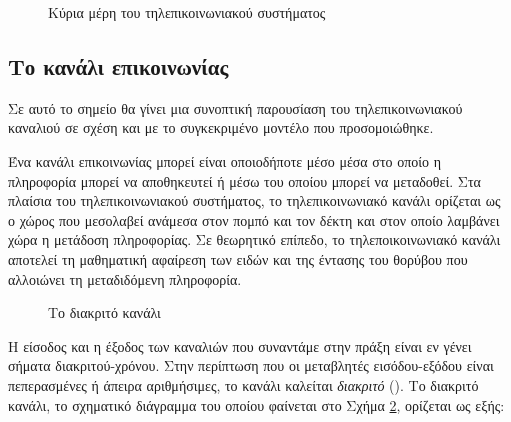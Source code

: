 \begin{figure}[h]
\caption{Κύρια μέρη του τηλεπικοινωνιακού συστήματος}
\label{fig:telecom system 2}
\end{figure}

\subsection*{Το κανάλι επικοινωνίας}
Σε αυτό το σημείο θα γίνει μια συνοπτική παρουσίαση του τηλεπικοινωνιακού καναλιού σε σχέση και με το συγκεκριμένο μοντέλο που προσομοιώθηκε.

Ένα κανάλι επικοινωνίας μπορεί είναι οποιοδήποτε μέσο μέσα στο οποίο η πληροφορία μπορεί να αποθηκευτεί ή μέσω του οποίου μπορεί να μεταδοθεί. Στα πλαίσια του τηλεπικοινωνιακού συστήματος, το τηλεπικοινωνιακό κανάλι ορίζεται ως ο χώρος που μεσολαβεί ανάμεσα στον πομπό και τον δέκτη και στον οποίο λαμβάνει χώρα η μετάδοση πληροφορίας. Σε θεωρητικό επίπεδο, το τηλεποικοινωνιακό κανάλι αποτελεί τη μαθηματική αφαίρεση των ειδών και της έντασης του θορύβου που αλλοιώνει τη μεταδιδόμενη πληροφορία.

\begin{figure}[h]
\caption{Το διακριτό κανάλι}
\label{fig:discrete channel}
\end{figure}

Η είσοδος και η έξοδος των καναλιών που συναντάμε στην πράξη είναι εν γένει σήματα διακριτού-χρόνου. Στην περίπτωση που οι μεταβλητές εισόδου-εξόδου είναι πεπερασμένες ή άπειρα αριθμήσιμες, το κανάλι καλείται \textit{διακριτό} (). Το διακριτό κανάλι, το σχηματικό διάγραμμα του οποίου φαίνεται στο Σχήμα \ref{fig:discrete channel}, ορίζεται ως εξής:

